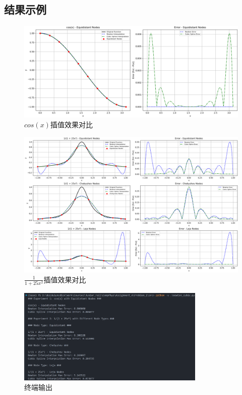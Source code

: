 \subsection{结果示例}
\begin{figure}[H]
    \centering
    \includegraphics[width=1.0\textwidth]{Problem_1/figs/cos.png}
    \caption{$cos(x)$插值效果对比}
\end{figure}

\begin{figure}[H]
    \centering
    \includegraphics[width=1.0\textwidth]{Problem_1/figs/rational.png}
    \caption{$\frac{1}{1+25x^2}$插值效果对比}
\end{figure}

\begin{figure}[H]
    \centering
    \includegraphics[width=0.8\textwidth]{Problem_1/figs/result.png}
    \caption{终端输出}
\end{figure}
